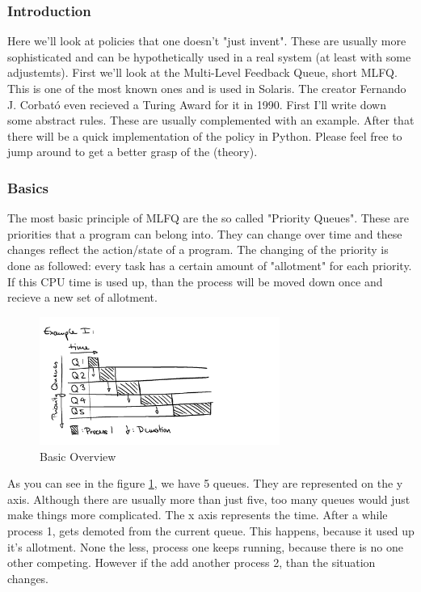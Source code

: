 \documentclass{report}
\begin{document}
\subsubsection{Introduction}
Here we'll look at policies that one doesn't "just invent".
These are usually more sophisticated and can be hypothetically used in a real system (at least with some adjustemts). 
First we'll look at the Multi-Level Feedback Queue, short MLFQ. 
This is one of the most known ones and is used in Solaris.
The creator Fernando J. Corbató even recieved a Turing Award for it in 1990.
First I'll write down some abstract rules. These are usually complemented with an example. 
After that there will be a quick implementation of the policy in Python.
Please feel free to jump around to get a better grasp of the (theory).

\subsubsection{Basics}

The most basic principle of MLFQ are the so called "Priority Queues". These are priorities that a program can belong into.
They can change over time and these changes reflect the action/state of a program.
The changing of the priority is done as followed: every task has a certain amount of "allotment" for each priority.
If this CPU time is used up, than the process will be moved down once and recieve a new set of allotment.

\begin{figure}[h]
  \begin{center}
    \includegraphics[width=0.7\textwidth]{assets/mlfq-diag-1.png}
    \caption{Basic Overview}
    \label{mlfq-diag-1}
  \end{center}
\end{figure}

As you can see in the figure \ref{mlfq-diag-1}, we have 5 queues. They are represented on the y axis. 
Although there are usually more than just five, too many queues would just make things more complicated. 
The x axis represents the time.
After a while process 1, gets demoted from the current queue. This happens, because it used up it's allotment.
None the less, process one keeps running, because there is no one other competing. 
However if the add another process 2, than the situation changes.
\end{document}
